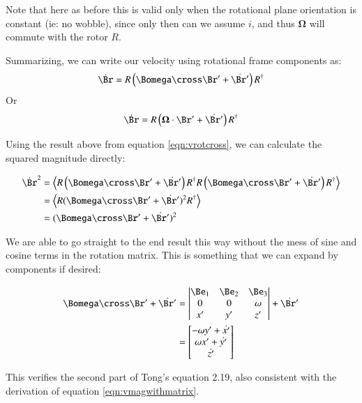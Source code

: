 \documentclass{article}      %
\newcommand{\dt}[1]{\dot{#1}}
\newcommand{\gpscalargrade}[1] {{\left\langle{{#1}}\right\rangle}}
\newcommand{\BOmega}[0]{\boldsymbol{\Omega}}
\begin{document}
Note that here as before this is valid only when the rotational plane orientation is constant (ie: no wobble), since only then can we assume $i$, and thus $\BOmega$ will commute with the rotor $R$.

Summarizing, we can write our velocity using rotational frame components
as: 
\begin{equation}\label{eqn:vrotcross}
\dt{\Br} = {R} \left( \Bomega \cross \Br' + \dt{\Br'} \right) R^\dagger
\end{equation}
Or
\begin{equation}
\dt{\Br} = {R} \left( \BOmega \cdot \Br' + \dt{\Br'} \right) R^\dagger
\end{equation}

Using the result above from equation \ref{eqn:vrotcross}, we can calculate
the squared magnitude directly:

\begin{align*}
\dt{\Br} ^2 
&= \gpscalargrade{ 
{R} \left( \Bomega \cross \Br' + \dt{\Br'} \right) R^\dagger
{R} \left( \Bomega \cross \Br' + \dt{\Br'} \right) R^\dagger
} \\
&= \gpscalargrade{ 
{R} ( \Bomega \cross \Br' + \dt{\Br'} ) ^2 R^\dagger
} \\
&= ( \Bomega \cross \Br' + \dt{\Br'} ) ^2 \\
\end{align*}

We are able to go straight to the end result this way without the mess
of sine and cosine terms in the rotation matrix.  This is something that
we can expand by components if desired:

\begin{align*}
\Bomega \cross \Br' + \dt{\Br'}
&= 
\begin{vmatrix}
\Be_1 & \Be_2 & \Be_3 \\
0 & 0 & \omega \\
x' & y' & z' \\
\end{vmatrix}
+ \dt{\Br'} \\
&=
\begin{bmatrix}
-\omega y' + \dt{x'} \\
\omega x' + \dt{y'} \\
 \dt{z'} \\
\end{bmatrix}
\end{align*}

This verifies the second part of Tong's equation 2.19, also consistent with the
derivation of equation \ref{eqn:vmagwithmatrix}.
\end{document}
